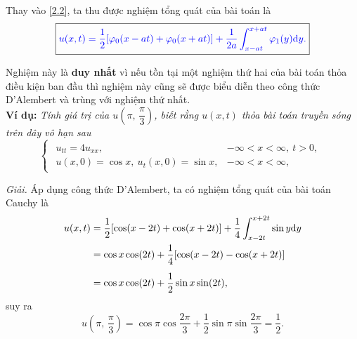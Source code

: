 \documentclass[10pt, a4paper]{article}
\begin{document}
	Thay vào \eqref{2.2}, ta thu được nghiệm tổng quát của bài toán là $$\boxed{\color{blue}u(x,t)=\dfrac12[\varphi_0(x-at)+\varphi_0(x+at)]+\dfrac{1}{2a}\displaystyle\int_{x-at}^{x+at}\varphi_1(y)\text{d}y.}$$
	
	Nghiệm này là \textbf{duy nhất} vì nếu tồn tại một nghiệm thứ hai của bài toán thỏa điều kiện ban đầu thì nghiệm này cũng sẽ được biểu diễn theo công thức D'Alembert và trùng với nghiệm thứ nhất.\\
	
	\textbf{Ví dụ:} \textit{Tính giá trị của $u\left(\pi,\,\dfrac\pi3\right)$, biết rằng $u(x,t)$ thỏa bài toán truyền sóng trên dây vô hạn sau} $$\begin{cases}
		\begin{array}{ll}
			u_{tt}=4u_{xx}, & -\infty<x<\infty,~t>0,\\
			u(x,0)=\cos x,~u_t(x,0)=\sin x, & -\infty<x<\infty,
		\end{array}
	\end{cases}$$
	
	\textit{Giải.} Áp dụng công thức D'Alembert, ta có nghiệm tổng quát của bài toán Cauchy là \begin{align*}
		u(x,t)&=\dfrac12[\cos(x-2t)+\cos(x+2t)]+\dfrac{1}{4}\displaystyle\int_{x-2t}^{x+2t}\sin y\text{d}y\\
		&=\cos x\cos(2t)+\frac{1}{4}[\cos(x-2t)-\cos(x+2t)]\\
		\noalign{\vskip5pt}
		&=\cos x\cos(2t)+\frac12\sin x\sin(2t),
	\end{align*}
	suy ra $$u\left(\pi,\,\dfrac\pi3\right)=\cos\pi\cos\frac{2\pi}{3}+\frac12\sin\pi\sin\frac{2\pi}{3}=\frac12.$$
\end{document}
